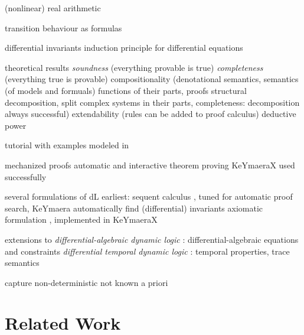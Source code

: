     (nonlinear) real arithmetic

    transition behaviour as formulas

    differential invariants
    induction principle for differential equations

    theoretical results
    \emph{soundness} (everything provable is true)
    \emph{completeness} (everything true is provable)
    compositionality (denotational semantics, semantics (of models and formuals) functions of their parts, proofs structural decomposition, split complex systems in their parts, completeness: decomposition always successful)
    extendability (rules can be added to proof calculus)
    deductive power

	tutorial with examples modeled in \dL
	\cite{Quesel16Tutorial}

	mechanized proofs
	automatic and interactive theorem proving
	KeYmaeraX
    used successfully

	several formulations of dL
	earliest: sequent calculus \cite{Platzer10HybridSystems}, tuned for automatic proof search, KeYmaera
    automatically find (differential) invariants
	axiomatic formulation \cite{Platzer15Uniform}, implemented in KeYmaeraX

    extensions to \dL
    \emph{differential-algebraic dynamic logic} \DAL: differential-algebraic equations and constraints
    \emph{differential temporal dynamic logic} \dTL: temporal properties, trace semantics


	capture non-deterministic
	not known a priori

	\section{Related Work}
	\cite{Huang16BoundedVerificationNNDS}